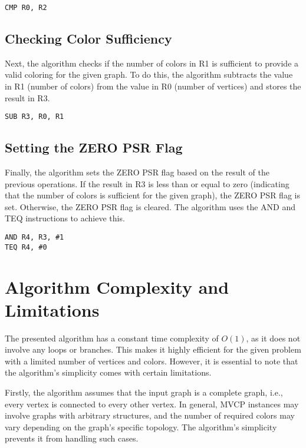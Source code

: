 \begin{verbatim}
CMP R0, R2
\end{verbatim}

\subsection{Checking Color Sufficiency}

Next, the algorithm checks if the number of colors in R1 is sufficient to provide a valid coloring for the given graph. To do this, the algorithm subtracts the value in R1 (number of colors) from the value in R0 (number of vertices) and stores the result in R3.

\begin{verbatim}
SUB R3, R0, R1
\end{verbatim}

\subsection{Setting the ZERO PSR Flag}

Finally, the algorithm sets the ZERO PSR flag based on the result of the previous operations. If the result in R3 is less than or equal to zero (indicating that the number of colors is sufficient for the given graph), the ZERO PSR flag is set. Otherwise, the ZERO PSR flag is cleared. The algorithm uses the AND and TEQ instructions to achieve this.

\begin{verbatim}
AND R4, R3, #1
TEQ R4, #0
\end{verbatim}

\section{Algorithm Complexity and Limitations}

The presented algorithm has a constant time complexity of $O(1)$, as it does not involve any loops or branches. This makes it highly efficient for the given problem with a limited number of vertices and colors. However, it is essential to note that the algorithm's simplicity comes with certain limitations.

Firstly, the algorithm assumes that the input graph is a complete graph, i.e., every vertex is connected to every other vertex. In general, MVCP instances may involve graphs with arbitrary structures, and the number of required colors may vary depending on the graph's specific topology. The algorithm's simplicity prevents it from handling such cases.

